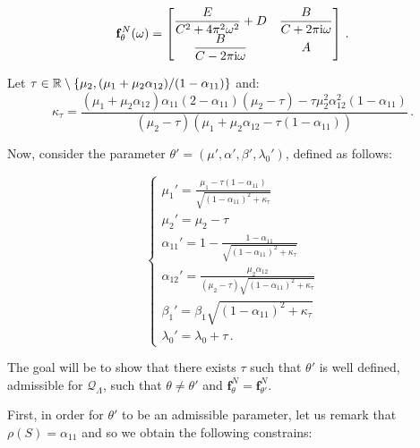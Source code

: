 \begin{subappendices}
\begin{itemize}
\begin{equation}\label{eq:chap4_bi_matrix_constants}
\mathbf{f}_\theta^N(\omega) = 
\begin{bmatrix}
  \dfrac{E}{C^2 + 4 \pi^2 \omega^2} + D & \dfrac{B}{C + 2 \pi \mathrm{i} \omega}\\
  \dfrac{B}{C - 2 \pi \mathrm{i} \omega} & A
\end{bmatrix}\,.
\end{equation}

Let $\tau\in{\mathbb R}\setminus \left\{\mu_2, (\mu_1 + \mu_2 \alpha_{12})/(1-\alpha_{11}) \right\}$ and: \[\kappa_\tau = \frac{(\mu_1 + \mu_2 \alpha_{12})\alpha_{11}(2-\alpha_{11})(\mu_2 - \tau) - \tau\mu_2^2 \alpha_{12}^2(1-\alpha_{11})}{(\mu_2 - \tau)(\mu_1 + \mu_2\alpha_{12} - \tau(1-\alpha_{11}))}\,.\]

Now, consider the parameter $\theta' = (\mu', \alpha', \beta', \lambda_0')$, defined as follows:

\begin{equation}\label{eq:chap4_bi_system_constants}
\begin{cases}
  \mu_1' = \frac{\mu_1 - \tau(1-\alpha_{11})}{\sqrt{(1-\alpha_{11})^2 + \kappa_\tau}}\\
  \mu_2' = \mu_2 - \tau\\
  \alpha_{11}' = 1 - \frac{1-\alpha_{11}}{\sqrt{(1-\alpha_{11})^2 + \kappa_\tau}}\\
  \alpha_{12}' = \frac{\mu_2 \alpha_{12}}{(\mu_2 - \tau)\sqrt{(1-\alpha_{11})^2 + \kappa_\tau}}\\
  \beta_1' = \beta_1 \sqrt{(1-\alpha_{11})^2 + \kappa_\tau}\\
  \lambda_0' = \lambda_0 + \tau\,.
\end{cases}
\end{equation}

The goal will be to show that there exists $\tau$ such that $\theta'$ is well defined, admissible for $\mathcal Q_\Lambda$, such that $\theta\neq\theta'$ and $\mathbf{f}_\theta^N = \mathbf{f}_{\theta'}^N$.

First, in order for $\theta'$ to be an admissible parameter, let us remark that $\rho(S) = \alpha_{11}$ and so we obtain the following constrains:


\end{itemize}
\end{subappendices}
